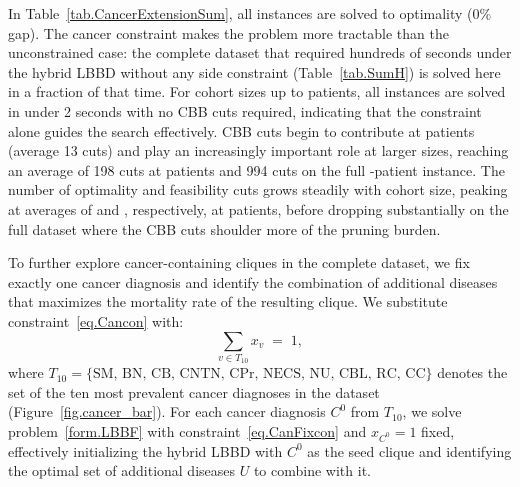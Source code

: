 In Table~\ref{tab.CancerExtensionSum}, all instances are solved to optimality (0\% gap). The cancer
constraint makes the problem more tractable than the
unconstrained case: the complete dataset that required hundreds of seconds under
the hybrid LBBD without any side constraint (Table~\ref{tab.SumH})
is solved here in a fraction of that time. For cohort sizes up to
 patients, all instances are solved in under 2
seconds with no CBB cuts required, indicating that the constraint
alone guides the search effectively. CBB cuts begin to contribute at
 patients (average 13 cuts) and play an increasingly
important role at larger sizes, reaching an average of 198 cuts at
 patients and 994 cuts on the full
-patient instance. The number of optimality and
feasibility cuts grows steadily with cohort size, peaking at averages
of  and , respectively, at
 patients, before dropping substantially on the full
dataset where the CBB cuts shoulder more of the pruning burden.

To further explore cancer-containing cliques in the complete dataset, we fix exactly one
cancer diagnosis and identify the combination of additional diseases
that maximizes the mortality rate of the resulting clique. We
substitute constraint~\eqref{eq.Cancon} with:
\begin{equation}\label{eq.CanFixcon}
    \sum_{v \in T_{10}} x_v \;=\; 1,
\end{equation}
where $T_{10} = \{\text{SM, BN, CB, CNTN, CPr, NECS, NU, CBL, RC, CC}\}$
denotes the set of the ten most prevalent cancer diagnoses in the
dataset (Figure~\ref{fig.cancer_bar}). For each cancer diagnosis
$C^0 $ from $T_{10}$, we solve problem~\eqref{form.LBBF} with
constraint~\eqref{eq.CanFixcon} and $x_{C^0} = 1$ fixed, effectively
initializing the hybrid LBBD with $C^0$ as the seed clique and
identifying the optimal set of additional diseases $U$ to combine
with it.

